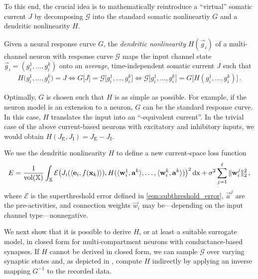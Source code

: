 To this end, the crucial idea is to mathematically reintroduce a \enquote{virtual} somatic current $J$ by decomposing $\mathscr{G}$ into the standard somatic nonlineartiy $G$ and a dendritic nonlinearity $H$.

\begin{definition}
\label{def:dendritic_nonlinearity}
Given a neural response curve $G$, the \emph{dendritic nonlinearity} $H(\vec g_i)$ of a multi-channel neuron with response curve $\mathscr{G}$ maps the input channel state $\vec g_i = (g^1_i, \ldots, g^k_i)$ onto an \emph{average}, time-independent somatic current $J$ such that
\begin{align}
		H\big(g^1_i, \ldots, g^k_i\big) = J
	\Leftrightarrow
		G\big[J\big] = \mathscr{G}\big[g^1_i, \ldots, g^k_i\big] 
	\Leftrightarrow
		\mathscr{G}\big[g^1_i, \ldots, g^k_i\big] = G\big[H(g^1_i, \ldots, g^k_i)\big] \,.
	\label{eqn:def_h}
\end{align}
\end{definition}
Optimally, $G$ is chosen such that $H$ is as simple as possible.
For example, if the neuron model is an extension to a \LIF neuron, $G$ can be the standard \LIF response curve.
In this case, $H$ translates the input into an \enquote{\LIF-equivalent current}.
In the trivial case of the above current-based \LIF neurons with excitatory and inhibitory inputs, we would obtain $H(J_\mathrm{E}, J_\mathrm{I}) = J_\mathrm{E} - J_\mathrm{I}$.

We use the dendritic nonlinearity $H$ to define a new current-space loss function
\begin{align}
	E = \frac{1}{\operatorname{vol}(\mathbb{X})} \int_{\mathbb{X}}
		\mathcal{E} \bigl(
			J_i(\langle \mathbf{e}_i, f(\mathbf{x}_k) \rangle),
			H(\langle \mathbf{w}^1_i, \mathbf{a}^k \rangle, \ldots, \langle \mathbf{w}^k_i, \mathbf{a}^k \rangle)
		\bigr)^2 \,\mathrm{dx} + \sigma^2 \sum_{j = 1}^\ell \| \mathbf{w}^j_i \|_2^2\,,
\label{eqn:decode_nonlinear_synapses}
\end{align}
where $\mathcal{E}$ is the superthreshold error defined in \cref{eqn:subthreshold_error}, $\vec a^j$ are the pre-activities, and connection weights $\vec w_i$ may be---depending on the input channel type---nonnegative.

We next show that it is possible to derive $H$, or at least a suitable surrogate model, in closed form for multi-compartment \LIF neurons with conductance-based synapses.
If $H$ cannot be derived in closed form, we can sample $\mathscr{G}$ over varying synaptic states and, as depicted in , compute $H$ indirectly by applying an inverse mapping $G^{-1}$ to the recorded data.
